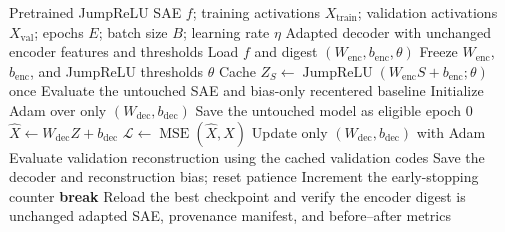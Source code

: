\documentclass[pdflatex,sn-mathphys-num]{sn-jnl}
\theoremstyle{thmstylethree}%
\begin{document}
\begin{appendices}
\begin{algorithm}[H]
\caption{Decoder-only adaptation of the pretrained SAE}
\label{alg:decoder-only-adaptation}
\begin{algorithmic}[1]
\Require Pretrained JumpReLU SAE $f$; training activations $X_{\mathrm{train}}$;
validation activations $X_{\mathrm{val}}$; epochs $E$; batch size $B$; learning rate $\eta$
\Ensure Adapted decoder with unchanged encoder features and thresholds
\State Load $f$ and digest $(W_{\mathrm{enc}},b_{\mathrm{enc}},\theta)$
\State Freeze $W_{\mathrm{enc}}$, $b_{\mathrm{enc}}$, and JumpReLU thresholds $\theta$
    \State Cache $Z_S\gets\operatorname{JumpReLU}(W_{\mathrm{enc}}S+b_{\mathrm{enc}};\theta)$ once
\EndFor
\State Evaluate the untouched SAE and bias-only recentered baseline
\State Initialize Adam over only $(W_{\mathrm{dec}},b_{\mathrm{dec}})$
\State Save the untouched model as eligible epoch 0
        \State $\widehat{X}\gets W_{\mathrm{dec}}Z+b_{\mathrm{dec}}$
        \State $\mathcal{L}\gets\operatorname{MSE}(\widehat{X},X)$
        \State Update only $(W_{\mathrm{dec}},b_{\mathrm{dec}})$ with Adam
    \EndFor
    \State Evaluate validation reconstruction using the cached validation codes
        \State Save the decoder and reconstruction bias; reset patience
    \Else
        \State Increment the early-stopping counter
    \EndIf
        \State \textbf{break}
    \EndIf
\EndFor
\State Reload the best checkpoint and verify the encoder digest is unchanged
\State \Return adapted SAE, provenance manifest, and before--after metrics
\end{algorithmic}
\end{algorithm}

\end{appendices}


\end{document}
